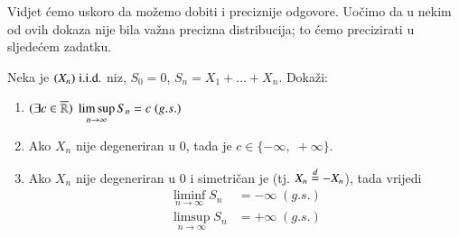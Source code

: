 Vidjet \' cemo uskoro da mo\v zemo dobiti i preciznije odgovore.
Uo\v cimo da u nekim od ovih dokaza nije bila va\v zna precizna distribucija; to \' cemo precizirati u sljede\' cem zadatku.

\begin{zad} \label{zad:10.4}
    Neka je $(X_n) \; \mathrm{i.i.d.}$ niz, $S_0 = 0$, $S_n = X_1 + \ldots + X_n$.
    Doka\v zi:
    \begin{enumerate}[label=(\alph*)]
        \item $(\exists c \in \overline{\mathbb{R}})\; \limsup\limits_{n \to \infty} S_n = c \; (g.s.)$
        \item Ako $X_n$ nije degeneriran u $0$, tada je $c \in \{-\infty, \; +\infty\}$.
        \item Ako $X_n$ nije degeneriran u $0$ i simetri\v can je (tj. $X_n \overset{d}{=} - X_n$), tada vrijedi
        \begin{equation*}
            \begin{aligned}
                \liminf\limits_{n \to \infty} S_n &= - \infty \; (g.s.)\\
                \limsup\limits_{n \to \infty} S_n &= +\infty \; (g.s.)
            \end{aligned}
        \end{equation*}
    \end{enumerate}
\end{zad}